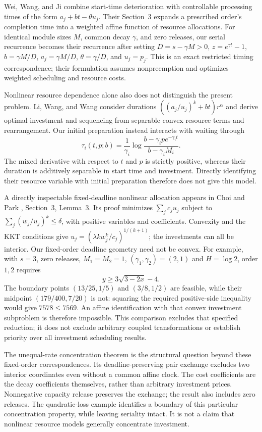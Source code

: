 Wei, Wang, and Ji \cite{WeiWangJi2012} combine start-time deterioration with
controllable processing times of the form $a_j+bt-\theta u_j$. Their
Section~3 expands a prescribed order's completion time into a weighted affine
function of resource allocations. For identical module sizes $M$, common
decay $\gamma$, and zero releases, our serial recurrence becomes their
recurrence after setting $D=s-\gamma M>0$, $z=e^{\gamma t}-1$,
$b=\gamma M/D$, $a_j=\gamma M/D$, $\theta=\gamma/D$, and $u_j=p_j$.
This is an exact restricted timing correspondence; their formulation assumes
nonpreemption and optimizes weighted scheduling and resource costs.

Nonlinear resource dependence alone also does not distinguish the present
problem. Li, Wang, and Wang \cite{LiWangWang2015} consider durations
$((a_j/u_j)^k+bt)r^\alpha$ and derive optimal investment and sequencing from
separable convex resource terms and rearrangement. Our initial preparation
instead interacts with waiting through
\[
 \tau_i(t,p;b)=\frac{1}{\gamma_i}
 \log\frac{b-\gamma_i p e^{-\gamma_i t}}{b-\gamma_iM_i}.
\]
The mixed derivative with respect to $t$ and $p$ is strictly positive, whereas
their duration is additively separable in start time and investment. Directly
identifying their resource variable with initial preparation therefore does
not give this model.

A directly inspectable fixed-deadline nonlinear allocation appears in
Choi and Park \cite{ChoiPark2023}, Section~3, Lemma~3. Its proof minimizes
$\sum_j c_j u_j$ subject to $\sum_j(w_j/u_j)^k\leq\delta$, with positive
variables and coefficients. Convexity and the KKT conditions give
$u_j=(\lambda k w_j^k/c_j)^{1/(k+1)}$; the investments can all be interior.
Our fixed-order deadline geometry need not be convex. For example, with
$s=3$, zero releases, $M_1=M_2=1$, $(\gamma_1,\gamma_2)=(2,1)$ and
$H=\log2$, order $1,2$ requires
\[
 y\geq3\sqrt{3-2x}-4.
\]
The boundary points $(13/25,1/5)$ and $(3/8,1/2)$ are feasible, while their
midpoint $(179/400,7/20)$ is not: squaring the required positive-side
inequality would give $7578\leq7569$. An affine identification with that
convex investment subproblem is therefore impossible. This comparison
excludes that specified reduction; it does not exclude arbitrary coupled
transformations or establish priority over all investment scheduling results.

The unequal-rate concentration theorem is the structural question beyond
these fixed-order correspondences. Its deadline-preserving pair exchange
excludes two interior coordinates even without a common affine clock. The
cost coefficients are the decay coefficients themselves, rather than arbitrary
investment prices. Nonnegative capacity release preserves the exchange; the
result also includes zero releases. The quadratic-loss example identifies a
boundary of this particular concentration property, while leaving seriality
intact. It is not a claim that nonlinear resource models generally concentrate
investment.

